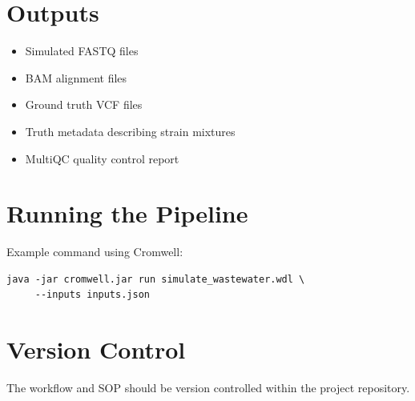 \documentclass[11pt]{article}
\begin{document}
\section{Outputs}

\begin{itemize}
\item Simulated FASTQ files
\item BAM alignment files
\item Ground truth VCF files
\item Truth metadata describing strain mixtures
\item MultiQC quality control report
\end{itemize}

\section{Running the Pipeline}

Example command using Cromwell:

\begin{verbatim}
java -jar cromwell.jar run simulate_wastewater.wdl \
     --inputs inputs.json
\end{verbatim}

\section{Version Control}

The workflow and SOP should be version controlled within the project repository.
\end{document}
